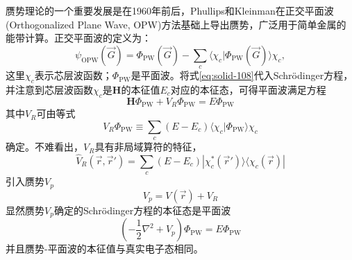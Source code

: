 赝势理论的一个重要发展是在1960年前后，Phullips和Kleinman\cite{PR116-287_1959}在正交平面波(Orthogonalized Plane Wave, OPW)方法\cite{PR57-1169_1940}基础上导出赝势，广泛用于简单金属的能带计算。正交平面波的定义为：
\begin{equation}
	\psi_{\mathrm{OPW}}(\vec G)=\Phi_{\mathrm{PW}}(\vec G)-\sum_c\langle\chi_c|\Phi_{\mathrm{PW}}(\vec G)\rangle\chi_c,
  \label{eq:solid-108}
\end{equation}
这里$\chi_c$表示芯层波函数；$\Phi_{\mathrm{PW}}$是平面波。将式\eqref{eq:solid-108}代入Schr\"odinger方程，%
并注意到芯层波函数$\chi_c$是$\mathbf H$的本征值$E_c$对应的本征态，可得平面波满足方程%
\begin{equation}
	\mathbf H\Phi_{\mathrm{PW}}+V_R\Phi_{\mathrm{PW}}=E\Phi_{\mathrm{PW}}
  \label{eq:solid-97}
\end{equation}
其中$V_R$可由等式
\begin{equation}
	V_R\Phi_{\mathrm{PW}}\equiv\sum\limits_c(E-E_c)\langle\chi_c|\Phi_{\mathrm{PW}}\rangle\chi_c
  \label{eq:solid-VR}
\end{equation}
确定。不难看出，$V_R$具有非局域算符的特征，%
\begin{equation}
	{\hat V}_R(\vec r,\vec r')=\sum_c(E-E_c)|\chi_c^{\ast}(\vec r')\rangle\langle\chi_c(\vec r)|
 \label{eq:solid-101}
\end{equation}
引入赝势$V_p$
\begin{equation}
  V_p=V(\vec r)+V_R
  \label{eq:solid-99}
\end{equation}
显然赝势$V_p$确定的Schr\"odinger方程的本征态是平面波
\begin{equation}
	(-\dfrac12\nabla^2+V_p)\Phi_{\mathrm{PW}}=E\Phi_{\mathrm{PW}}
  \label{eq:solid-98}
\end{equation}
并且赝势-平面波的本征值与真实电子态相同。%

